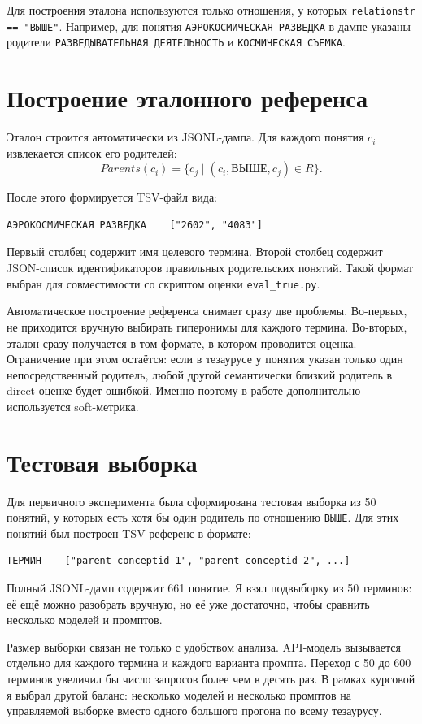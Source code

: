 \documentclass[12pt,a4paper,oneside,openany]{report}
\begin{document}
Для построения эталона используются только отношения, у которых \texttt{relationstr == "ВЫШЕ"}. Например, для понятия \texttt{АЭРОКОСМИЧЕСКАЯ РАЗВЕДКА} в дампе указаны родители \texttt{РАЗВЕДЫВАТЕЛЬНАЯ ДЕЯТЕЛЬНОСТЬ} и \texttt{КОСМИЧЕСКАЯ СЪЕМКА}.

\section{Построение эталонного референса}

Эталон строится автоматически из JSONL-дампа. Для каждого понятия $c_i$ извлекается список его родителей:
\[
Parents(c_i) = \{c_j \mid (c_i, \texttt{ВЫШЕ}, c_j) \in R\}.
\]

После этого формируется TSV-файл вида:
\begin{verbatim}
АЭРОКОСМИЧЕСКАЯ РАЗВЕДКА    ["2602", "4083"]
\end{verbatim}

Первый столбец содержит имя целевого термина. Второй столбец содержит JSON-список идентификаторов правильных родительских понятий. Такой формат выбран для совместимости со скриптом оценки \texttt{eval\_true.py}.

Автоматическое построение референса снимает сразу две проблемы. Во-первых, не приходится вручную выбирать гиперонимы для каждого термина. Во-вторых, эталон сразу получается в том формате, в котором проводится оценка. Ограничение при этом остаётся: если в тезаурусе у понятия указан только один непосредственный родитель, любой другой семантически близкий родитель в direct-оценке будет ошибкой. Именно поэтому в работе дополнительно используется soft-метрика.

\section{Тестовая выборка}

Для первичного эксперимента была сформирована тестовая выборка из 50 понятий, у которых есть хотя бы один родитель по отношению \texttt{ВЫШЕ}. Для этих понятий был построен TSV-референс в формате:
\begin{verbatim}
ТЕРМИН    ["parent_conceptid_1", "parent_conceptid_2", ...]
\end{verbatim}

Полный JSONL-дамп содержит 661 понятие. Я взял подвыборку из 50 терминов: её ещё можно разобрать вручную, но её уже достаточно, чтобы сравнить несколько моделей и промптов.

Размер выборки связан не только с удобством анализа. API-модель вызывается отдельно для каждого термина и каждого варианта промпта. Переход с 50 до 600 терминов увеличил бы число запросов более чем в десять раз. В рамках курсовой я выбрал другой баланс: несколько моделей и несколько промптов на управляемой выборке вместо одного большого прогона по всему тезаурусу.
\end{document}
